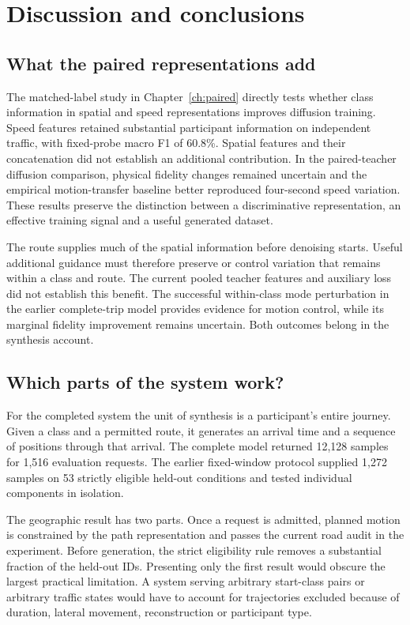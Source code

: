 \chapter{Discussion and conclusions}
\label{ch:discussion}
\section{What the paired representations add}
The matched-label study in Chapter~\ref{ch:paired} directly tests whether class information in spatial and speed representations improves diffusion training. Speed features retained substantial participant information on independent traffic, with fixed-probe macro F1 of 60.8\%. Spatial features and their concatenation did not establish an additional contribution. In the paired-teacher diffusion comparison, physical fidelity changes remained uncertain and the empirical motion-transfer baseline better reproduced four-second speed variation. These results preserve the distinction between a discriminative representation, an effective training signal and a useful generated dataset.

The route supplies much of the spatial information before denoising starts. Useful additional guidance must therefore preserve or control variation that remains within a class and route. The current pooled teacher features and auxiliary loss did not establish this benefit. The successful within-class mode perturbation in the earlier complete-trip model provides evidence for motion control, while its marginal fidelity improvement remains uncertain. Both outcomes belong in the synthesis account.

\section{Which parts of the system work?}
For the completed system the unit of synthesis is a participant's entire journey. Given a class and a permitted route, it generates an arrival time and a sequence of positions through that arrival. The complete model returned 12,128 samples for 1,516 evaluation requests. The earlier fixed-window protocol supplied 1,272 samples on 53 strictly eligible held-out conditions and tested individual components in isolation.

The geographic result has two parts. Once a request is admitted, planned motion is constrained by the path representation and passes the current road audit in the experiment. Before generation, the strict eligibility rule removes a substantial fraction of the held-out IDs. Presenting only the first result would obscure the largest practical limitation. A system serving arbitrary start-class pairs or arbitrary traffic states would have to account for trajectories excluded because of duration, lateral movement, reconstruction or participant type.

